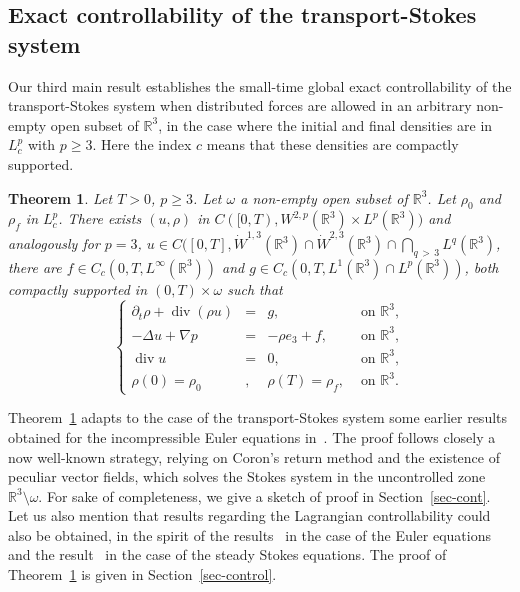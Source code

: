 \documentclass[10pt]{amsart}
\newtheorem{theo}{Theorem}[section]
\theoremstyle{definition}\newtheorem{defi}[theo]{Definition}\newtheorem{rema}[theo]{Remark}\newtheorem{exam}[theo]{Example}\newtheorem{exem}[theo]{Example}\newtheorem{nota}[theo]{Notation}
\newcommand{\R}{\mathbb{R}}
\renewcommand{\geq}{\geqslant}
\renewcommand{\div}{\operatorname{div}}
\begin{document}
\subsection{Exact controllability of the transport-Stokes system}

Our third main result establishes the small-time global exact controllability of the transport-Stokes system when distributed forces are allowed in an arbitrary non-empty open subset of $\R^3$, in the case where the initial and final densities are in $L^p_c$ with $p \geq 3$. Here the index $c$ means that these densities are compactly supported.

\begin{theo}\label{TS-control}
Let $T>0$, $p\geq 3$. Let $\omega$ a non-empty open subset of $\R^3$. Let $\rho_0$ and $\rho_f$ in $L^p_c$. There exists $ (u,\rho)$ in $C([0,T),W^{2,p}(\R^3) \times L^p(\R^3))$ and analogously for $p=3$, $u \in C([0,T],\dot{W}^{1,3}(\R^3)\cap \dot{W}^{2,3}(\R^3) \cap \bigcap_{q\,>\,3} L^q(\R^3)$, there are $f \in C_c(0,T, L^\infty(\R^3))$ and $g \in C_c(0,T,L^1(\R^3)\cap L^p(\R^3)) $, both compactly supported in $(0,T)\times \omega $ such that
\begin{equation*}
\left \{
\begin{array}{rcll}
\partial_t \rho +\div(\rho u)&=& g,& \text{ on } \R^3,\\
-\Delta u+\nabla p &=& - \rho e_3+f,& \text{ on } \R^3,\\
\div u&=& 0,& \text{ on } \R^3,\\
\rho(0)=\rho_0&,& \rho(T)=\rho_f,& \text{ on } \R^3.
\end{array}
\right.
\end{equation*}
\end{theo}

Theorem~\ref{TS-control} adapts to the case of the transport-Stokes system some earlier results obtained for the incompressible Euler equations in~\cite{Coron96,G20,G}. The proof follows closely a now well-known strategy, relying on Coron's return method and the existence of peculiar vector fields, which solves the Stokes system in the uncontrolled zone $\R^3 \setminus \omega$. For sake of completeness, we give a sketch of proof in Section~\ref{sec-cont}. Let us also mention that results regarding the Lagrangian controllability could also be obtained, in the spirit of the results~\cite{GH1,GH2,HK} in the case of the Euler equations and the result~\cite{GH3} in the case of the steady Stokes equations. The proof of Theorem~\ref{TS-control} is given in Section~\ref{sec-control}.
\end{document}
